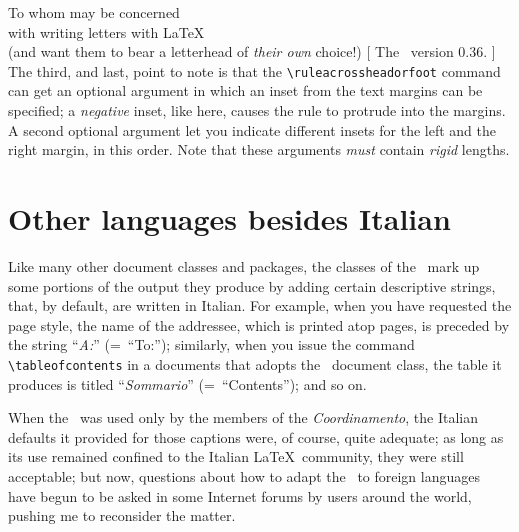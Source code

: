 \begin{letterhead}{
	To whom may be concerned\\
	with writing letters with \LaTeX\\
	(and want them to bear a letterhead
	of \emph{their own} choice!)
}[
	The \Bundle\ version 0.36.
]
The third, and last, point to note is that the \verb|\ruleacrossheadorfoot|
command can get an optional argument in which an inset from the text margins can
be specified; a \emph{negative} inset, like here, causes the rule to protrude
into the margins.  A second optional argument let you indicate different insets
for the left and the right margin, in this order.  Note that these arguments
\emph{must} contain \emph{rigid} lengths.



\section{Other languages besides Italian}
\label{S:Languages}

Like many other document classes and packages, the classes of the \Bundle\ mark
up some portions of the output they produce by adding certain descriptive
strings, that, by default, are written in Italian.  For example, when you have
requested the  page style, the name of the addressee, which is
printed atop pages, is preceded by the string ``\emph{A:}'' (=~``To:'');
similarly, when you issue the command \verb|\tableofcontents| in a documents
that adopts the \acdp\ document class, the table it produces is titled
``\emph{Sommario}'' (=~``Contents''); and so on.

When the \Bundle\ was used only by the members of the \emph{Coordinamento}, the
Italian defaults it provided for those captions were, of course, quite adequate;
as long as its use remained confined to the Italian \LaTeX\ community, they were
still acceptable; but now, questions about how to adapt the \Bundle\ to foreign
languages have begun to be asked in some Internet forums by users around the
world, pushing me to reconsider the matter.


\end{letterhead}
